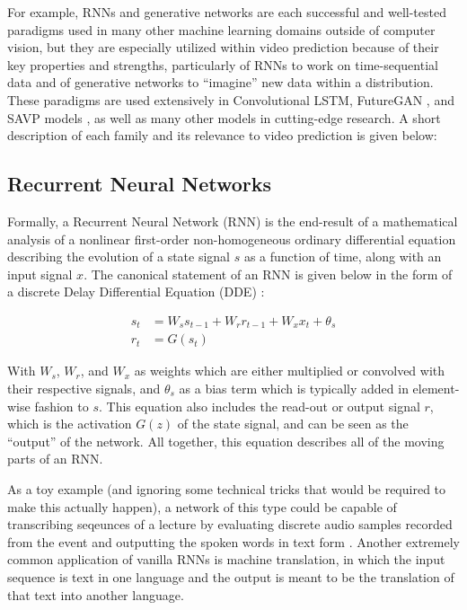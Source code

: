 \documentclass{scrartcl}
\begin{document}
For example, RNNs and generative networks are each successful and well-tested
paradigms used in many other machine learning domains outside of computer
vision, but they are especially utilized within video prediction because of
their key properties and strengths, particularly of RNNs to work on
time-sequential data and of generative networks to ``imagine'' new data within
a distribution. These paradigms are used extensively in Convolutional LSTM,
FutureGAN \cite{futuregan}, and SAVP models \cite{savp}, as well as many other
models in cutting-edge research. A short description of each family and its
relevance to video prediction is given below:

\subsection{Recurrent Neural Networks}
\label{subsec:rnn}

Formally, a Recurrent Neural Network (RNN) is the end-result of a mathematical
analysis of a nonlinear first-order non-homogeneous ordinary differential
equation describing the evolution of a state signal $s$ as a function of time,
along with an input signal $x$. The canonical statement of an RNN is given
below in the form of a discrete Delay Differential Equation (DDE)
\cite{rnn_and_lstm_fundamentals}:

\begin{equation}
	\begin{split}
		s_t & = W_s s_{t - 1} + W_r r_{t - 1} + W_x x_t + \theta_s \\
		r_t & = G ( s_t )
	\end{split}
	\label{eq:rnn_canonical}
\end{equation}

With $W_s$, $W_r$, and $W_x$ as weights which are either multiplied or
convolved with their respective signals, and $\theta_s$ as a bias term
which is typically added in element-wise fashion to $s$. This equation
also includes the read-out or output signal $r$, which is the activation
$G(z)$ of the state signal, and can be seen as the ``output'' of the network.
All together, this equation describes all of the moving parts of an RNN.

As a toy example (and ignoring some technical tricks that would be required to
make this actually happen), a network of this type could be capable of
transcribing seqeunces of a lecture by evaluating discrete audio samples
recorded from the event and outputting the spoken words in text form
\cite{rnn_and_lstm_fundamentals}. Another extremely common application of
vanilla RNNs is machine translation, in which the input sequence is text in one
language and the output is meant to be the translation of that text into
another language.
\end{document}
